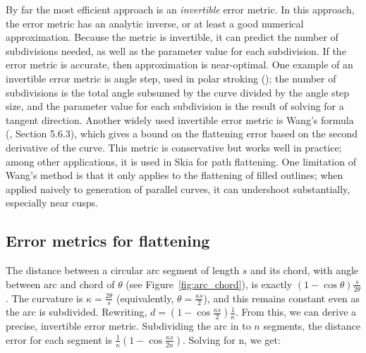 \documentclass[sigconf, authordraft]{acmart}
\begin{document}
By far the most efficient approach is an \emph{invertible} error metric. In this approach, the error metric has an analytic inverse, or at least a good numerical approximation. Because the metric is invertible, it can predict the number of subdivisions needed, as well as the parameter value for each subdivision. If the error metric is accurate, then approximation is near-optimal. One example of an invertible error metric is angle step, used in polar stroking (\citet{Kilgard2020}); the number of subdivisions is the total angle subsumed by the curve divided by the angle step size, and the parameter value for each subdivision is the result of solving for a tangent direction. Another widely used invertible error metric is Wang's formula (\citet{Goldman2003}, Section 5.6.3), which gives a bound on the flattening error based on the second derivative of the curve. This metric is conservative but works well in practice; among other applications, it is used in Skia for path flattening. One limitation of Wang's method is that it only applies to the flattening of filled outlines; when applied naively to generation of parallel curves, it can undershoot substantially, especially near cusps.


\subsection{Error metrics for flattening}

The distance between a circular arc segment of length $s$ and its chord, with angle between arc and chord of $\theta$ (see Figure~\ref{fig:arc_chord}), is exactly $(1-\cos \theta)\frac{s}{2\theta}$. The curvature is $\kappa = \frac{2\theta}{s}$ (equivalently, $\theta = \frac{\kappa s}{2}$), and this remains constant even as the arc is subdivided. Rewriting, $d = (1-\cos\frac{\kappa s}{2})\frac{1}{\kappa}$. From this, we can derive a precise, invertible error metric. Subdividing the arc in to $n$ segments, the distance error for each segment is $\frac{1}{\kappa}(1-\cos \frac{\kappa s}{2n})$. Solving for n, we get:
\end{document}
